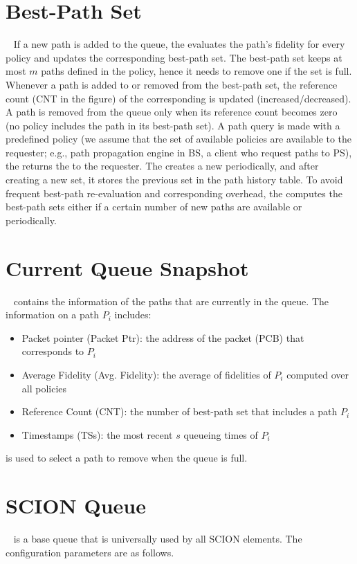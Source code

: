 
\section{Best-Path Set}~\label{subsec:bestpath}
If a new path is added to the queue, the \pse evaluates the path's fidelity for every policy and updates the corresponding best-path set. The best-path set keeps at most $m$ paths defined in the policy, hence it needs to remove one if the set is full. Whenever a path is added to or removed from the best-path set, the reference count (CNT in the figure) of the corresponding \qs is updated (increased/decreased). A path is removed from the queue only when its reference count becomes zero (no policy includes the path in its best-path set).
A path query is made with a predefined policy (we assume that the set of available policies are available to the requester; e.g., path propagation engine in BS, a client who request paths to PS), the \pse returns the \bps to the requester. The \pse creates a new \bps periodically, and after creating a new set, it stores the previous set in the path history table.
To avoid frequent best-path re-evaluation and corresponding overhead, the \pse computes the best-path sets either if a certain number of new paths are available or periodically.

\section{Current Queue Snapshot}~\label{subsec:queue-snapshot}
\QS contains the information of the paths that are currently in the queue. The information on a path $P_i$ includes:
\begin{itemize}
\item{Packet pointer (Packet Ptr): } the address of the packet (PCB) that corresponds to $P_i$
\item{Average Fidelity (Avg. Fidelity): } the average of fidelities of $P_i$ computed over all policies
\item{Reference Count (CNT): } the number of best-path set that includes a path $P_i$
\item{Timestamps (TSs): } the most recent $s$ queueing times of $P_i$
\end{itemize}
\QS is used to select a path to remove when the queue is full.

\section{SCION Queue}~\label{subsec:scion-queue}
\SQ is a base queue that is universally used by all SCION elements. The configuration parameters are as follows.

